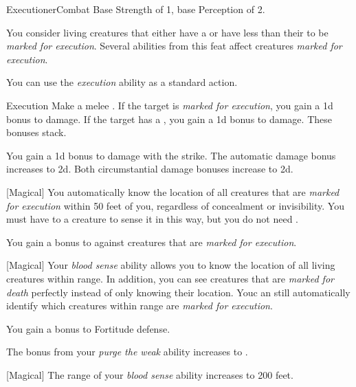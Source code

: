     \begin{feat}{Executioner}{Combat}
        \featpres Base Strength of 1, base Perception of 2.

         You consider living creatures that either have a  or have less than their  to be \textit{marked for execution}.
        Several abilities from this feat affect creatures \textit{marked for execution}.

         You can use the \textit{execution} ability as a standard action.
        \begin{freeability}{Execution}
            Make a melee .
            If the target is \textit{marked for execution}, you gain a \plus1d bonus to damage.
            If the target has a , you gain a \plus1d bonus to damage.
            These bonuses stack.

            \rankline
             You gain a \plus1d bonus to damage with the strike.
             The automatic damage bonus increases to \plus2d.
             Both circumstantial damage bonuses increase to \plus2d.
        \end{freeability}

        [Magical] You automatically know the location of all creatures that are \textit{marked for execution} within 50 feet of you, regardless of concealment or invisibility.
        You must have  to a creature to sense it in this way, but you do not need .

         You gain a  bonus to  against creatures that are \textit{marked for execution}.

        [Magical] Your \textit{blood sense} ability allows you to know the location of all living creatures within range.
        In addition, you can see creatures that are \textit{marked for death} perfectly instead of only knowing their location.
        Youc an still automatically identify which creatures within range are \textit{marked for execution}.

         You gain a  bonus to Fortitude defense.

         The bonus from your \textit{purge the weak} ability increases to .

        [Magical] The range of your \textit{blood sense} ability increases to 200 feet.
    \end{feat}

